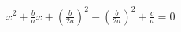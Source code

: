 \documentclass[preview]{standalone}
\begin{document}
\begin{align*}
x^2 + \frac{b}{a}x + (\frac{b}{2a})^2 - (\frac{b}{2a})^2 + \frac{c}{a} = 0
\end{align*}
\end{document}
